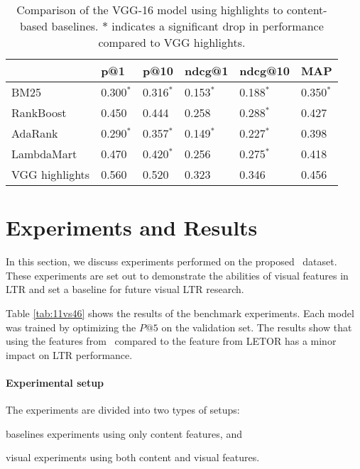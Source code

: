 \begin{table}[h]
\caption{Comparison of the VGG-16 model using highlights to content-based baselines. $*$ indicates a significant drop in performance compared to VGG highlights. }

\label{tab:baseresults}
\begin{tabular}{llllll}
\toprule
                      & p@1    & p@10  & ndcg@1  & ndcg@10 & MAP   \\
\midrule
BM25                  & 0.300$^*$  & 0.316$^*$ & 0.153$^*$   & 0.188$^*$   & 0.350$^*$ \\ 
\midrule
RankBoost             & 0.450  & 0.444 & 0.258   & 0.288$^*$    & 0.427 \\
AdaRank               & 0.290$^*$   & 0.357$^*$  & 0.149$^*$    & 0.227$^*$    & 0.398 \\
LambdaMart            & 0.470  & 0.420$^*$ & 0.256   & 0.275$^*$    & 0.418 \\ 
\midrule
VGG highlights        & 0.560  & 0.520 & 0.323   & 0.346   & 0.456 \\ 
\bottomrule
\end{tabular}
\end{table}


\section{Experiments and Results}
In this section, we discuss experiments performed on the proposed \datasetname~dataset.
These experiments are set out to demonstrate the abilities of visual features in LTR and set a baseline for future visual LTR research.

Table \ref{tab:11vs46} shows the results of the benchmark experiments. Each model was trained by optimizing the $P@5$ on the validation set. The results show that using the features from \datasetname~compared to the feature from LETOR has a minor impact on \ac{LTR} performance.
\fi

\paragraph{Experimental setup}
The experiments are divided into two types of setups:
\begin{inparaenum}[(i)]
\item baselines experiments using only content features, and
\item visual experiments using both content and visual features.
\end{inparaenum}

